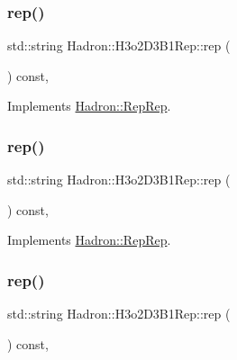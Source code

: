 \subsubsection{\texorpdfstring{rep()}{rep()}\hspace{0.1cm}{\footnotesize\ttfamily [1/3]}}
{\footnotesize\ttfamily std\+::string Hadron\+::\+H3o2\+D3\+B1\+Rep\+::rep (\begin{DoxyParamCaption}{ }\end{DoxyParamCaption}) const\hspace{0.3cm}{\ttfamily [inline]}, {\ttfamily [virtual]}}



Implements \mbox{\hyperlink{structHadron_1_1RepRep_ab3213025f6de249f7095892109575fde}{Hadron\+::\+Rep\+Rep}}.

\mbox{\label{structHadron_1_1H3o2D3B1Rep_acf8f745ca578c355ecbb4097e8c0ce39}} 
\subsubsection{\texorpdfstring{rep()}{rep()}\hspace{0.1cm}{\footnotesize\ttfamily [2/3]}}
{\footnotesize\ttfamily std\+::string Hadron\+::\+H3o2\+D3\+B1\+Rep\+::rep (\begin{DoxyParamCaption}{ }\end{DoxyParamCaption}) const\hspace{0.3cm}{\ttfamily [inline]}, {\ttfamily [virtual]}}



Implements \mbox{\hyperlink{structHadron_1_1RepRep_ab3213025f6de249f7095892109575fde}{Hadron\+::\+Rep\+Rep}}.

\mbox{\label{structHadron_1_1H3o2D3B1Rep_acf8f745ca578c355ecbb4097e8c0ce39}} 
\subsubsection{\texorpdfstring{rep()}{rep()}\hspace{0.1cm}{\footnotesize\ttfamily [3/3]}}
{\footnotesize\ttfamily std\+::string Hadron\+::\+H3o2\+D3\+B1\+Rep\+::rep (\begin{DoxyParamCaption}{ }\end{DoxyParamCaption}) const\hspace{0.3cm}{\ttfamily [inline]}, {\ttfamily [virtual]}}



